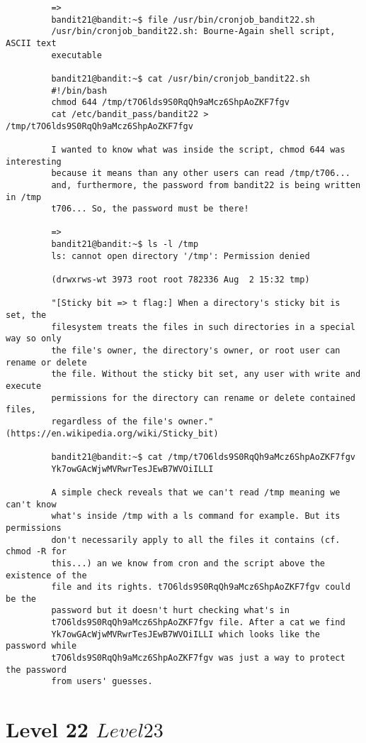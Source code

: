 \documentclass[a4paper]{report}
\begin{document}
\begin{verbatim}
		 =>
		 bandit21@bandit:~$ file /usr/bin/cronjob_bandit22.sh 
		 /usr/bin/cronjob_bandit22.sh: Bourne-Again shell script, ASCII text
		 executable
		 
		 bandit21@bandit:~$ cat /usr/bin/cronjob_bandit22.sh 
		 #!/bin/bash
		 chmod 644 /tmp/t7O6lds9S0RqQh9aMcz6ShpAoZKF7fgv
		 cat /etc/bandit_pass/bandit22 > /tmp/t7O6lds9S0RqQh9aMcz6ShpAoZKF7fgv

		 I wanted to know what was inside the script, chmod 644 was interesting
		 because it means than any other users can read /tmp/t706...
		 and, furthermore, the password from bandit22 is being written in /tmp
		 t706... So, the password must be there!

		 =>
		 bandit21@bandit:~$ ls -l /tmp
		 ls: cannot open directory '/tmp': Permission denied
		 
		 (drwxrws-wt 3973 root root 782336 Aug  2 15:32 tmp)
		 
		 "[Sticky bit => t flag:] When a directory's sticky bit is set, the 
		 filesystem treats the files in such directories in a special way so only 
		 the file's owner, the directory's owner, or root user can rename or delete 
		 the file. Without the sticky bit set, any user with write and execute 
		 permissions for the directory can rename or delete contained files, 
		 regardless of the file's owner." (https://en.wikipedia.org/wiki/Sticky_bit)
		 
		 bandit21@bandit:~$ cat /tmp/t7O6lds9S0RqQh9aMcz6ShpAoZKF7fgv
		 Yk7owGAcWjwMVRwrTesJEwB7WVOiILLI
		 
		 A simple check reveals that we can't read /tmp meaning we can't know 
		 what's inside /tmp with a ls command for example. But its permissions 
		 don't necessarily apply to all the files it contains (cf. chmod -R for
		 this...) an we know from cron and the script above the existence of the 
		 file and its rights. t7O6lds9S0RqQh9aMcz6ShpAoZKF7fgv could be the 
		 password but it doesn't hurt checking what's in
		 t7O6lds9S0RqQh9aMcz6ShpAoZKF7fgv file. After a cat we find
		 Yk7owGAcWjwMVRwrTesJEwB7WVOiILLI which looks like the password while 
		 t7O6lds9S0RqQh9aMcz6ShpAoZKF7fgv was just a way to protect the password 
		 from users' guesses.
\end{verbatim}


\section{Level 22 \rightarrow $ Level 23 $}
\end{document}
